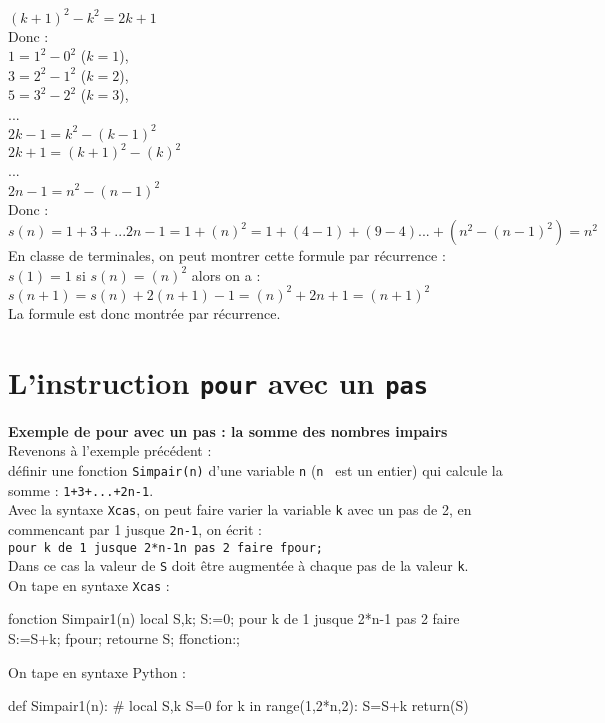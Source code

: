 \documentclass[12pt,a4paper]{book}
\begin{document}
\begin{giacjshere}
$(k+1)^2-k^2=2k+1$\\
Donc :\\
$1=1^2-0^2$ ($k=1$),\\
$3=2^2-1^2$ ($k=2$),\\
$5=3^2-2^2$ ($k=3$),\\
...\\
$2k-1=k^2-(k-1)^2$\\
$2k+1=(k+1)^2-(k)^2$\\
...\\
$2n-1=n^2-(n-1)^2$\\
Donc :\\
$s(n)=1+3+...2n-1=1+(n)^2=1+(4-1)+(9-4)...+(n^2-(n-1)^2)=n^2$\\
En classe de terminales, on peut montrer cette formule par r\'ecurrence :\\
$s(1)=1$ si $s(n)=(n)^2$ alors on a :\\
$s(n+1)=s(n)+2(n+1)-1=(n)^2+2n+1=(n+1)^2$\\
La formule est donc montr\'ee par r\'ecurrence.


\section{L'instruction {\tt pour} avec un {\tt pas}}
{\bf Exemple de pour avec un pas : la somme des nombres impairs }\\
Revenons \`a l'exemple pr\'ec\'edent :\\
 d\'efinir une fonction {\tt Simpair(n)} d'une variable {\tt n} ({\tt n } est 
un  entier) qui calcule la somme : {\tt 1+3+...+2n-1}.\\
Avec la syntaxe {\tt Xcas}, on peut faire varier la variable {\tt k} avec un 
pas de 2, en commencant par 1 jusque {\tt 2n-1}, on \'ecrit :\\
{\tt pour k de 1 jusque 2*n-1n pas 2 faire  fpour;}\\
Dans ce cas la valeur de {\tt S} doit \^etre augment\'ee \`a chaque pas de la 
valeur {\tt k}.\\
On tape en syntaxe {\tt Xcas} :
\begin{giaconload}
fonction Simpair1(n) 
 local S,k;
 S:=0; 
 pour k de 1 jusque 2*n-1 pas 2 faire 
   S:=S+k; 
 fpour;
 retourne S; 
ffonction:;
\end{giaconload}
On tape en syntaxe Python :
\begin{giacprog}
def Simpair1(n):
    # local S,k
    S=0
    for k in range(1,2*n,2):
       S=S+k 
    return(S)
\end{giacprog}


\end{giacjshere}
\end{document}
